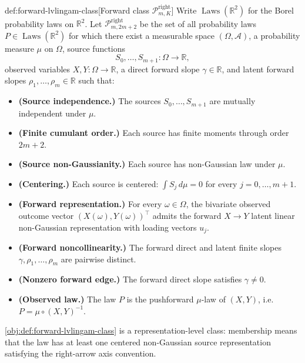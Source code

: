 \begin{definitionv}{def:forward-lvlingam-class}[Forward class \(\mathcal P^{\mathrm{right}}_{m,K}\)]
Write \(\operatorname{Laws}(\mathbb R^2)\) for the Borel probability laws on \(\mathbb R^2\). Let \(\mathcal P^{\mathrm{right}}_{m,2m+2}\) be the set of all probability laws \(P\in \operatorname{Laws}(\mathbb R^2)\) for which there exist a measurable space \((\Omega,\mathcal A)\), a probability measure \(\mu\) on \(\Omega\), source functions
\[
S_0,\ldots,S_{m+1}:\Omega\to\mathbb R,
\]
observed variables \(X,Y:\Omega\to\mathbb R\), a direct forward slope \(\gamma\in\mathbb R\), and latent forward slopes \(\rho_1,\ldots,\rho_m\in\mathbb R\) such that:
\begin{itemize}
\item \textbf{(Source independence.)} The sources \(S_0,\ldots,S_{m+1}\) are mutually independent under \(\mu\).
\item \textbf{(Finite cumulant order.)} Each source has finite moments through order \(2m+2\).
\item \textbf{(Source non-Gaussianity.)} Each source has non-Gaussian law under \(\mu\).
\item \textbf{(Centering.)} Each source is centered: \(\int S_j\,d\mu=0\) for every \(j=0,\ldots,m+1\).
\item \textbf{(Forward representation.)} For every \(\omega\in\Omega\), the bivariate observed outcome vector \((X(\omega),Y(\omega))^\top\) admits the forward \(X\to Y\) latent linear non-Gaussian representation with loading vectors \(u_j\).
\item \textbf{(Forward noncollinearity.)} The forward direct and latent finite slopes \(\gamma,\rho_1,\ldots,\rho_m\) are pairwise distinct.
\item \textbf{(Nonzero forward edge.)} The forward direct slope satisfies \(\gamma\ne 0\).
\item \textbf{(Observed law.)} The law \(P\) is the pushforward \(\mu\)-law of \((X,Y)\), i.e. \(P=\mu\circ (X,Y)^{-1}\).
\end{itemize}
\end{definitionv}

\cref{obj:def:forward-lvlingam-class} is a representation-level class: membership means that the law has at least one centered non-Gaussian source representation satisfying the right-arrow axis convention.


